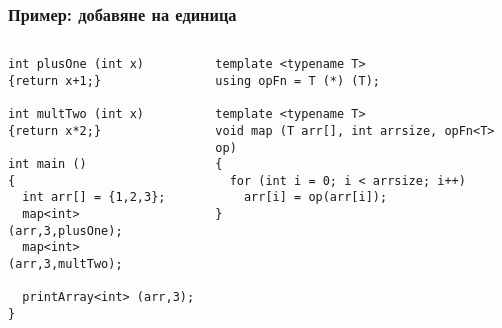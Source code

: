 \documentclass{beamer}
\begin{document}
\begin{frame}[fragile]
\frametitle{Пример: добавяне на единица}


\begin{columns}[t]
  \begin{column}{0.5\textwidth}

\begin{flushleft}
\begin{lstlisting}
int plusOne (int x)
{return x+1;}

int multTwo (int x)
{return x*2;}

int main ()
{
  int arr[] = {1,2,3};
  map<int> (arr,3,plusOne);
  map<int> (arr,3,multTwo);

  printArray<int> (arr,3);
}

\end{lstlisting}  
\end{flushleft}
  \end{column}
  \begin{column}{0.5\textwidth}
\begin{flushleft}
\begin{lstlisting}
template <typename T>
using opFn = T (*) (T);

template <typename T>
void map (T arr[], int arrsize, opFn<T> op)
{
  for (int i = 0; i < arrsize; i++)
    arr[i] = op(arr[i]);
}
\end{lstlisting}  
\end{flushleft}

  \end{column}
\end{columns}


\end{frame}
\end{document}
